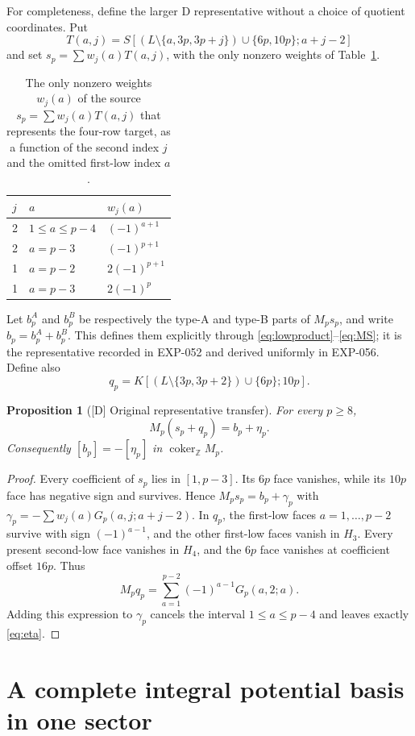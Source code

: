 \documentclass[11pt]{article}
\newtheorem{proposition}[theorem]{Proposition}
\theoremstyle{definition}
\theoremstyle{remark}
\newcommand{\Z}{\mathbb Z}
\newcommand{\coker}{\operatorname{coker}}
\begin{document}
For completeness, define the larger D representative without a choice of
quotient coordinates. Put
\[
 T(a,j)=S[(L\setminus\{a,3p,3p+j\})\cup\{6p,10p\};a+j-2]
\]
and set $s_p=\sum w_j(a)T(a,j)$, with the only nonzero weights
of Table~\ref{tab:weights}.
\begin{table}[t]
\centering
\begin{tabular}{lll}
\toprule
$j$ & $a$ & $w_j(a)$\\
\midrule
2 & $1\leq a\leq p-4$ & $(-1)^{a+1}$\\
2 & $a=p-3$ & $(-1)^{p+1}$\\
1 & $a=p-2$ & $2(-1)^{p+1}$\\
1 & $a=p-3$ & $2(-1)^p$\\
\bottomrule
\end{tabular}
\caption{The only nonzero weights $w_j(a)$ of the source $s_p=\sum w_j(a)T(a,j)$ that represents the
four-row target, as a function of the second index $j$ and the omitted first-low index $a$.}
\label{tab:weights}
\end{table}
Let $b_p^A$ and $b_p^B$ be respectively the type-A and type-B parts of
$M_ps_p$, and write $b_p=b_p^A+b_p^B$. This defines them explicitly
through \eqref{eq:lowproduct}--\eqref{eq:MS}; it is the representative
recorded in EXP-052 and derived uniformly in EXP-056. Define also
\[
 q_p=K[(L\setminus\{3p,3p+2\})\cup\{6p\};10p].
\]

\begin{proposition}[{[D]} Original representative transfer]\label{prop:transfer}
For every $p\geq8$,
\begin{equation}\label{eq:transfer}
 M_p(s_p+q_p)=b_p+\eta_p.
\end{equation}
Consequently $[b_p]=-[\eta_p]$ in $\coker_{\Z}M_p$.
\end{proposition}
\begin{proof}
Every coefficient of $s_p$ lies in $[1,p-3]$. Its $6p$ face vanishes,
while its $10p$ face has negative sign and survives. Hence
$M_ps_p=b_p+\gamma_p$ with
$\gamma_p=-\sum w_j(a)G_p(a,j;a+j-2)$.
In $q_p$, the first-low faces $a=1,\ldots,p-2$ survive with sign
$(-1)^{a-1}$, and the other first-low faces vanish in $H_3$.
Every present second-low face vanishes in $H_4$, and the $6p$ face
vanishes at coefficient offset $16p$. Thus
\[
 M_pq_p=\sum_{a=1}^{p-2}(-1)^{a-1}G_p(a,2;a).
\]
Adding this expression to $\gamma_p$ cancels the interval
$1\leq a\leq p-4$ and leaves exactly \eqref{eq:eta}.
\end{proof}

\section{A complete integral potential basis in one sector}\label{sec:basis}
\end{document}
